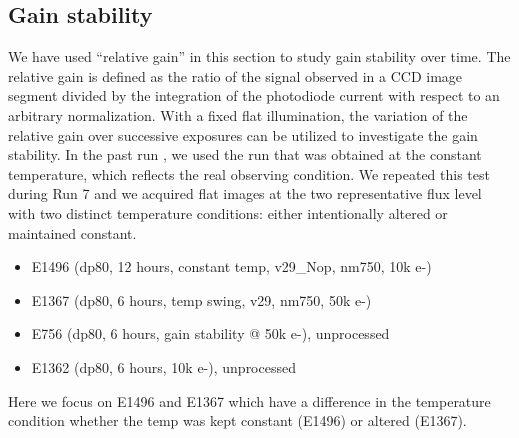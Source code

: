 \subsection{Gain stability}\label{sec:gain-stability-2}
We have used ``relative gain'' in this section to study gain stability over time. 
The relative gain is defined as the ratio of the signal observed in a CCD image segment divided by the integration of the photodiode current with respect to an arbitrary normalization.
With a fixed flat illumination, the variation of the relative gain over successive exposures can be utilized to investigate the gain stability. 
In the past run \citep{2024SPIE13103E..0WU}, we used the run that was obtained at the constant temperature, which reflects the real observing condition. We repeated this test during Run 7 and we acquired flat images at the two representative flux level with two distinct temperature conditions: either intentionally altered or maintained constant.
\begin{itemize}
    \item E1496 (dp80, 12 hours, constant temp, v29\_Nop, nm750, 10k e-)
    \item E1367 (dp80, 6 hours, temp swing, v29, nm750, 50k e-)
    \item E756 (dp80, 6 hours, gain stability @ 50k e-), unprocessed
    \item E1362 (dp80, 6 hours, 10k e-), unprocessed
\end{itemize}

Here we focus on E1496 and E1367 which have a difference in the temperature condition whether the temp was kept constant (E1496) or altered (E1367).

